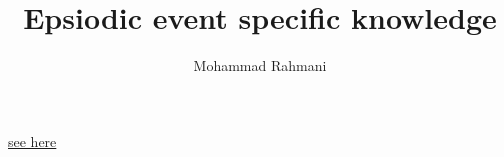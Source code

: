 \documentclass[a4paper]{article}
\title{Epsiodic event specific knowledge}
\date{}
\author{Mohammad Rahmani}
\begin{document}
   \maketitle

   \href{/nd_robotic_ai_learning_project/src/robot/part/mind/cognition/part/object_level/process/parts/memory/part/memorizing/part/explicity/explicit/long_term/part/episodic/autobigraphical/parts/event_specific_knowledge/event_specific_knowledge.tex}{see here}
   

   
   
\end{document}
